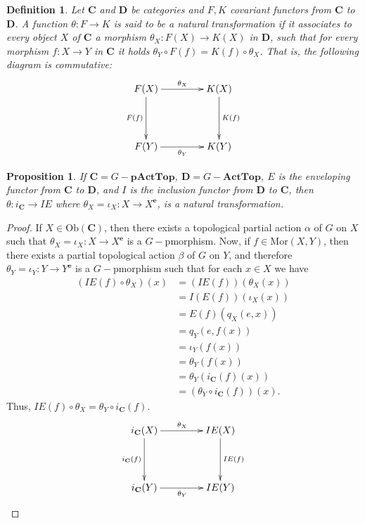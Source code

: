 \documentclass[sn-mathphys-num]{sn-jnl}%
\theoremstyle{thmstyleone}%
\newtheorem{proposition}[theorem]{Proposition}%
\theoremstyle{thmstyletwo}%
\theoremstyle{thmstylethree}%
\newtheorem{definition}{Definition}%
\begin{document}
\begin{definition}
Let $ \mathbf{C} $ and $ \mathbf{D} $ be categories and $ F, K $  covariant functors from $ \mathbf{C} $ to $ \mathbf {D} $. A function $ \theta: F \to K $ is said to be a natural transformation if it associates to every object $ X $ of $ \mathbf{C}$ a morphism $ \theta_X: F (X) \to K (X) $ in $ \mathbf{D}$, such that for every morphism $ f: X \to Y $ in $ \mathbf {C} $ it holds $\theta_{Y}\circ F(f) = K(f)\circ\theta_X$. That is, the following diagram is commutative:
$$
\xymatrix@=1.5cm{
F(X) \ar[r]^{\theta_X} \ar[d]_{F(f)} & K(X)\ar[d]^{K(f)}\\
F(Y)\ar[r]_{\theta_Y}& K(Y)
}
$$
\end{definition}

\begin{proposition}\label{nat}
If $ \mathbf{C} = G-\mathbf{pActTop} $, $ \mathbf{D} = G-\mathbf{ActTop} $, $ E $ is the enveloping functor from $ \mathbf{C} $ to $ \mathbf {D} $, and $ I $ is the inclusion functor from $ \mathbf{D} $ to $ \mathbf{C} $, then $ \theta: i_{\mathbf {C}} \to IE $ where $ \theta_X = \iota_X: X \to X^\mathbf{e} $, is a natural transformation.
\end{proposition}
\begin{proof}
If $ X \in \text{Ob} (\mathbf{C}) $, then there exists a topological partial action $ \alpha $ of $ G $ on $ X $ such that $ \theta_X = \iota_X: X \to X^\mathbf{e} $ is a $G-$pmorphism.
Now, if $ f \in \text{Mor} (X, Y) $, then there exists a partial topological action $ \beta $ of $ G $ on $ Y $, and therefore $ \theta_Y = \iota_Y: Y \to Y^\mathbf {e} $ is a $G-$pmorphism such that for each $ x \in X $ we have
\begin{align*}
(IE(f)\circ \theta_X)(x)&= (IE(f))(\theta_X(x))\\
&= I(E(f))(\iota_X(x))\\
&= E(f)(q_X(e,x))\\
&=q_Y(e,f(x))\\
&=\iota_Y(f(x))\\
&=\theta_Y(f(x))\\
&=\theta_Y(i_{\mathbf{C}}(f)(x))\\
&=(\theta_Y\circ i_{\mathbf{C}}(f))(x).
\end{align*}
Thus,  $IE(f)\circ \theta_X= \theta_Y\circ i_{\mathbf{C}}(f)$.
$$
\xymatrix@=1.5cm{
i_{\mathbf{C}}(X) \ar[r]^{\theta_X} \ar[d]_{i_{\mathbf{C}}(f)} & IE(X)\ar[d]^{IE(f)}\\
i_{\mathbf{C}}(Y)\ar[r]_{\theta_Y}& IE(Y)
}
$$
\end{proof}
\end{document}
